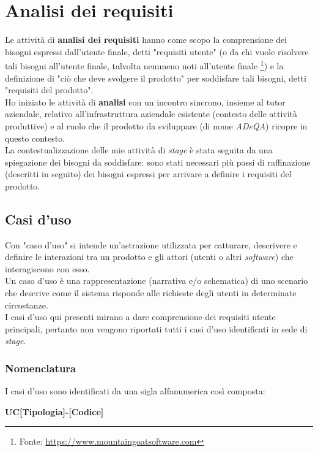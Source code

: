 \section{Analisi dei requisiti}
Le attività di \textbf{analisi dei requisiti} hanno come scopo la comprensione dei bisogni espressi dall'utente finale, detti "requisiti utente" (o da chi vuole risolvere tali bisogni all'utente finale, talvolta nemmeno noti all'utente finale \footnote{Fonte: \href{https://www.mountaingoatsoftware.com/articles/i-didnt-know-i-needed-that}{https://www.mountaingoatsoftware.com}})
e la definizione di "ciò che deve svolgere il prodotto" per soddisfare tali bisogni, detti "requisiti del prodotto". \\
Ho iniziato le attività di \textbf{analisi} con un incontro sincrono, insieme al tutor aziendale, relativo all'infrastruttura aziendale esistente (contesto delle attività produttive) e al ruolo che il prodotto da sviluppare (di nome \textit{ADeQA}) ricopre in questo contesto. \\
La contestualizzazione delle mie attività di \textit{stage} è stata seguita da una spiegazione dei bisogni da soddisfare: sono stati necessari più passi di raffinazione (descritti in seguito) dei bisogni espressi per arrivare a definire i requisiti del prodotto.

\subsection{Casi d'uso}
Con "caso d'uso" si intende un'astrazione utilizzata per catturare, descrivere e definire le interazioni tra un prodotto e gli attori (utenti o altri \textit{software}) che interagiscono con esso. \\
Un caso d'uso è una rappresentazione (narrativa e/o schematica) di uno scenario che descrive come il sistema risponde alle richieste degli utenti in determinate circostanze. \\
I casi d’uso qui presenti mirano a dare comprensione dei requisiti utente principali, pertanto non vengono riportati tutti i casi d'uso identificati in sede di \textit{stage}.
\subsubsection*{Nomenclatura}

I casi d'uso sono identificati da una sigla alfanumerica così composta:
\begin{center}
    \textbf{UC[Tipologia]-[Codice]}
\end{center}

